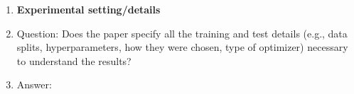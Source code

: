 \begin{enumerate}
\item {\bf Experimental setting/details}
    \item[] Question: Does the paper specify all the training and test details (e.g., data splits, hyperparameters, how they were chosen, type of optimizer) necessary to understand the results?
    \item[] Answer: \new{\answerYes{}}

\end{enumerate}

